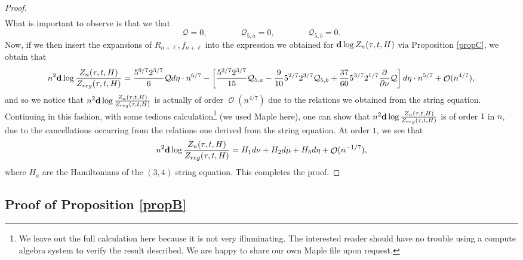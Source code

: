 \documentclass[usenames,dvipsnames]{article}
\theoremstyle{definition}
\DeclareMathOperator{\OO}{\mathcal{O}}
\numberwithin{equation}{section}
\numberwithin{figure}{section}
\begin{document}
\begin{proof}
\begin{align*}
            \end{align*}
            What is important to observe is that we that
            \begin{equation*}
                \mathcal{Q} = 0, \qquad\qquad \mathcal{Q}_{5,a} = 0,\qquad\qquad \mathcal{Q}_{5,b} = 0.
            \end{equation*}
        Now, if we then insert the expansions of $R_{n+\ell}, f_{n+\ell}$ into the expression we obtained for ${\bf d}\log Z_n(\tau,t,H)$ via 
        Proposition \ref{propC}, we obtain that
            \begin{equation*}
                n^2{\bf d}\log \frac{Z_n(\tau,t,H)}{Z_{reg}(\tau,t,H)} = \frac{5^{9/7}2^{3/7}}{6} \mathcal{Q} d\eta \cdot n^{6/7} - \left[\frac{5^{2/7}2^{3/7}}{15}\mathcal{Q}_{5,a} - \frac{9}{10}5^{2/7}2^{3/7}\mathcal{Q}_{5,b} + \frac{37}{60}5^{3/7}2^{1/7}\frac{\partial}{\partial \nu}\mathcal{Q}\right] d\eta \cdot n^{5/7} + \OO(n^{4/7}),
            \end{equation*}
        and so we notice that $n^2{\bf d}\log \frac{Z_n(\tau,t,H)}{Z_{reg}(\tau,t,H)}$ is actually of order $\OO(n^{4/7})$ due to the relations we 
        obtained from the string equation. Continuing in this fashion, with some tedious calculation\footnote{We leave out the full calculation here because it is not very illuminating. The interested reader should have no trouble using a compute algebra system to verify the result described. We are happy to share our own Maple file upon request.} (we used Maple here), one can show that $n^2{\bf d}\log \frac{Z_n(\tau,t,H)}{Z_{reg}(\tau,t,H)}$ is of order $1$ in $n$, due to the cancellations occurring from the relations one derived from the string equation. At order $1$, we see that
            \begin{equation*}
                n^2{\bf d}\log \frac{Z_n(\tau,t,H)}{Z_{reg}(\tau,t,H)} = H_1d\nu + H_2d\mu + H_5d\eta + \OO(n^{-1/7}),
            \end{equation*}
        where $H_a$ are the Hamiltonians of the $(3,4)$ string equation. This completes the proof.
\end{proof}

\subsection{Proof of Proposition \ref{propB}} \label{propB-proof}

\end{document}
